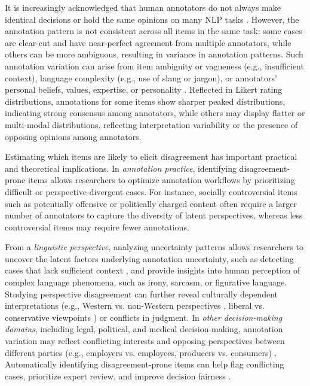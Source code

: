 \documentclass{article} %
\begin{document}
\vspace{0.1cm}



It is increasingly acknowledged that human annotators do not always make identical decisions or hold the same opinions on many NLP tasks \citep{plank-2022-problem, uma2021learning,basile2021we}. However, the annotation pattern is not consistent across all items in the same task: some cases are clear-cut and have near-perfect agreement from multiple annotators, while others can be more ambiguous, resulting in variance in annotation patterns.  
Such annotation variation can arise from item ambiguity or vagueness (e.g., insufficient context), language complexity (e.g., use of slang or jargon), or annotators’ personal beliefs, values, expertise, or personality \citep{sap-etal-2020-social,sap-etal-2022-annotators}. 
Reflected in Likert rating distributions, annotations for some items show sharper peaked distributions, indicating strong consensus among annotators, while others may display flatter or multi-modal distributions, reflecting interpretation variability or the presence of opposing opinions among annotators. 


\vspace{0.15cm}

Estimating which items are likely to elicit disagreement has important practical and theoretical implications. In \textit{{annotation practice}}, identifying disagreement-prone items allows researchers to optimize annotation workflows by prioritizing difficult or perspective-divergent cases. For instance, socially controversial items such as potentially offensive or politically charged content often require a larger number of annotators to capture the diversity of latent perspectives, whereas less controversial items may require fewer annotations.
\vspace{0.15cm}


From a \textit{{linguistic perspective}}, analyzing uncertainty patterns allows researchers to uncover the latent factors underlying annotation uncertainty, such as detecting cases that lack sufficient context \citep{sandri-etal-2023-dont}, and provide insights into human perception of complex language phenomena, such as irony, sarcasm, or figurative language. Studying perspective disagreement can further reveal culturally dependent interpretations (e.g., Western vs. non-Western perspectives \citep{sap-etal-2022-annotators,huang2023culturally,larimore-etal-2021-reconsidering}, liberal vs. conservative viewpoints \citep{luo-etal-2020-detecting}) or conflicts in judgment.  
In \textit{{other decision-making domains}}, including legal, political, and medical decision-making, annotation variation may reflect conflicting interests and opposing perspectives between different parties (e.g., employers vs. employees, producers vs. consumers) \citep{angouri2012managing,braun2024beg}.
Automatically identifying disagreement-prone items can help flag conflicting cases, prioritize expert review, and improve decision fairness \citep{patel-etal-2018-annotation}.
\end{document}
